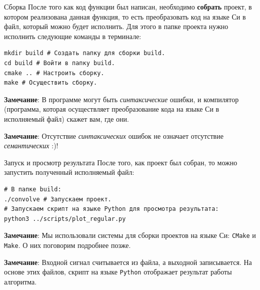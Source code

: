 \documentclass{beamer}
\begin{document}
    \begin{frame}[fragile]{Сборка}
        \justifying
        После того как код функции был написан, необходимо {\bf собрать} проект, в котором реализована 
        данная функция, то есть преобразовать код на языке Си в файл, который можно будет исполнить. Для этого в папке проекта нужно исполнить следующие команды в терминале:
        \begin{verbatim}
mkdir build # Создать папку для сборки build.
cd build # Войти в папку build.
cmake .. # Настроить сборку.
make # Осуществить сборку.
        \end{verbatim}
        \par
        \justifying
        {\bf Замечание}: В программе могут быть {\it синтаксические} ошибки, и компилятор (программа, которая осуществляет преобразование кода на языке Си в исполняемый файл) скажет вам, где они. 
        \par
        {\bf Замечание}: Отсутствие {\it синтаксических} ошибок не означает отсутствие {\it семантических} :)!
    \end{frame}
    \begin{frame}[fragile]{Запуск и просмотр результата}
        \justifying
        После того, как проект был собран, то можно запустить полученный исполняемый файл:
        \begin{verbatim}
# В папке build:
./convolve # Запускаем проект.
# Запускаем скрипт на языке Python для просмотра результата:
python3 ../scripts/plot_regular.py  
        \end{verbatim}
        {\bf Замечание}: Мы использовали системы для сборки проектов на языке Си: {\tt CMake} и {\tt Make}. О них поговорим подробнее позже.
        \par 
        {\bf Замечание}: Входной сигнал считывается из файла, а выходной записывается. На основе этих файлов, скрипт на языке {\tt Python} отображает результат работы алгоритма. 
    \end{frame}
\end{document}
